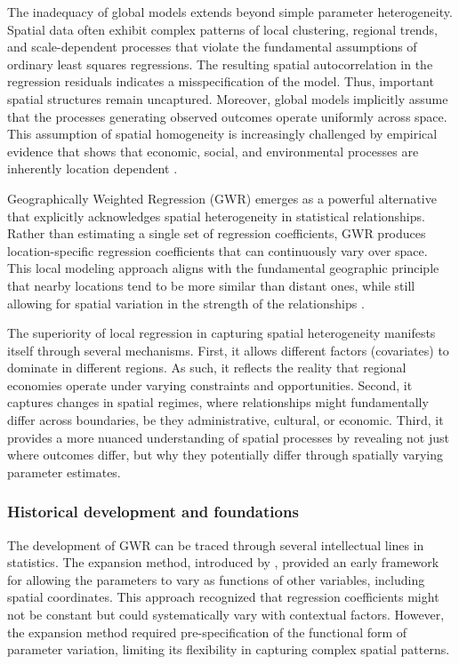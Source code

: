 \documentclass[smallextended, natbib]{svjour3}       %
\begin{document}
The inadequacy of global models extends beyond simple parameter heterogeneity. 
Spatial data often exhibit complex patterns of local clustering, regional trends, and scale-dependent processes that violate the fundamental assumptions of ordinary least squares regressions.
The resulting spatial autocorrelation in the regression residuals indicates a misspecification of the model.
Thus, important spatial structures remain uncaptured. 
Moreover, global models implicitly assume that the processes generating observed outcomes operate uniformly across space.
This assumption of spatial homogeneity is increasingly challenged by empirical evidence that shows that economic, social, and environmental processes are inherently location dependent \citep{anselin1988spatial}.

Geographically Weighted Regression (GWR) emerges as a powerful alternative that explicitly acknowledges spatial heterogeneity in statistical relationships. 
Rather than estimating a single set of regression coefficients, GWR produces location-specific regression coefficients that can continuously vary over space. 
This local modeling approach aligns with the fundamental geographic principle that nearby locations tend to be more similar than distant ones, while still allowing for spatial variation in the strength of the relationships \citep{tobler1970computer}.

The superiority of local regression in capturing spatial heterogeneity manifests itself through several mechanisms. 
First, it allows different factors (covariates) to dominate in different regions. 
As such, it reflects the reality that regional economies operate under varying constraints and opportunities. 
Second, it captures changes in spatial regimes, where relationships might fundamentally differ across boundaries, be they administrative, cultural, or economic. 
Third, it provides a more nuanced understanding of spatial processes by revealing not just where outcomes differ, but why they potentially differ through spatially varying parameter estimates.

\subsubsection*{Historical development and foundations}

The development of GWR can be traced through several intellectual lines in statistics.
The expansion method, introduced by \cite{casetti1972generating}, provided an early framework for allowing the parameters to vary as functions of other variables, including spatial coordinates. 
This approach recognized that regression coefficients might not be constant but could systematically vary with contextual factors. 
However, the expansion method required pre-specification of the functional form of parameter variation, limiting its flexibility in capturing complex spatial patterns.
\end{document}
